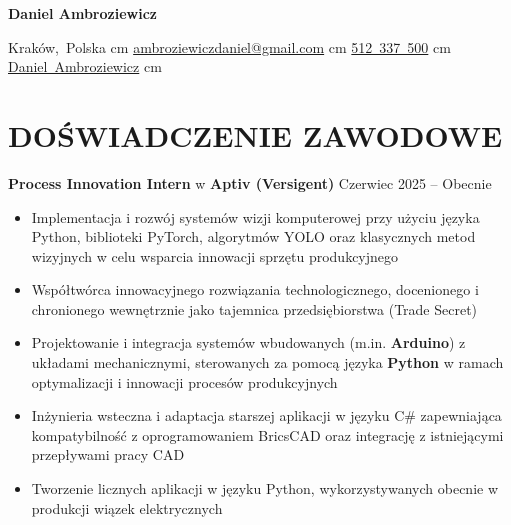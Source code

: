 \documentclass[a4paper,10pt]{extarticle}
\begin{document}
\pagestyle{empty}

\begin{center}
    \fontsize{26 pt}{26 pt}\selectfont
    \textbf{Daniel Ambroziewicz}

    \vspace{0.3 cm}

    \normalsize
    \mbox{{\footnotesize\faMapMarker*}\hspace*{0.13cm}Kraków, Polska}%
     cm%
    \mbox{\href{mailto:ambroziewiczdaniel@gmail.com}{{\footnotesize\faEnvelope[regular]}\hspace*{0.13cm}ambroziewiczdaniel@gmail.com}}%
     cm%
    \mbox{\href{tel:+48-512-337-500}{{\footnotesize\faPhone*}\hspace*{0.13cm}512 337 500}}%
     cm%
    \mbox{\href{https://www.linkedin.com/in/daniel-ambroziewicz-9343a414a/}{{\footnotesize\faLinkedinIn}\hspace*{0.13cm}Daniel Ambroziewicz}}%
     cm%
\end{center}

\section*{DOŚWIADCZENIE ZAWODOWE}

\noindent
\textbf{Process Innovation Intern} w \textbf{Aptiv (Versigent)} \hfill Czerwiec 2025 – Obecnie
\begin{itemize}
    \item Implementacja i rozwój systemów wizji komputerowej przy użyciu języka Python, biblioteki PyTorch, algorytmów YOLO oraz klasycznych metod wizyjnych w celu wsparcia innowacji sprzętu produkcyjnego
    \item Współtwórca innowacyjnego rozwiązania technologicznego, docenionego i chronionego wewnętrznie jako tajemnica przedsiębiorstwa (Trade Secret)
    \item Projektowanie i integracja systemów wbudowanych (m.in. \textbf{Arduino}) z układami mechanicznymi, sterowanych za pomocą języka \textbf{Python} w ramach optymalizacji i innowacji procesów produkcyjnych
    \item Inżynieria wsteczna i adaptacja starszej aplikacji w języku C\# zapewniająca kompatybilność z oprogramowaniem BricsCAD oraz integrację z istniejącymi przepływami pracy CAD
    \item Tworzenie licznych aplikacji w języku Python, wykorzystywanych obecnie w produkcji wiązek elektrycznych
\end{itemize}
\end{document}

